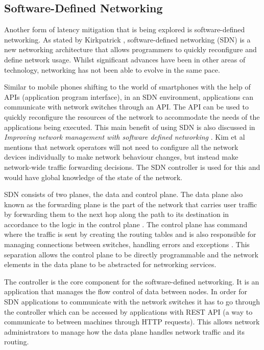 \subsection{Software-Defined Networking}
Another form of latency mitigation that is being explored is software-defined networking. As stated by Kirkpatrick \cite{kirkpatrick2013software}, software-defined networking (SDN) is a new networking architecture that allows programmers to quickly reconfigure and define network usage. Whilst significant advances have been in other areas of technology, networking has not been able to evolve in the same pace.
\newline
\par
Similar to mobile phones shifting to the world of smartphones with the help of APIs (application program interface), in an SDN environment, applications can communicate with network switches through an API. The API can be used to quickly reconfigure the resources of the network to accommodate the needs of the applications being executed. This main benefit of using SDN is also discussed in \textit{Improving network management with software defined networking} \cite{kim2013improving}. Kim et al mentions that network operators will not need to configure all the network devices individually to make network behaviour changes, but instead make network-wide traffic forwarding decisions. The SDN controller is used for this and would have global knowledge of the state of the network.
\newline
\par
SDN consists of two planes, the data and control plane. The data plane also known as the forwarding plane is the part of the network that carries user traffic by forwarding them to the next hop along the path to its destination in accordance to the logic in the control plane \cite{dataplane}. The control plane has command where the traffic is sent by creating the routing tables and is also responsible for managing connections between switches, handling errors and exceptions \cite{controlplane}. This separation allows the control plane to be directly programmable and the network elements in the data plane to be abstracted for networking services.
\newline
\par
The controller is the core component for the software-defined networking. It is an application that manages the flow control of data between nodes. In order for SDN applications to communicate with the network switches it has to go through the controller which can be accessed by applications with REST API (a way to communicate to between machines through HTTP requests). This allows network administrators to manage how the data plane handles network traffic and its routing.

